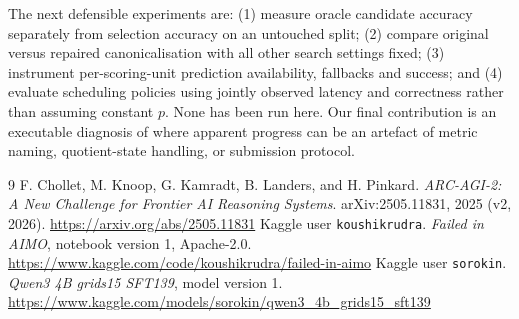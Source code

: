 \documentclass[10pt,a4paper]{article}
\begin{document}
The next defensible experiments are: (1) measure oracle candidate accuracy separately from selection accuracy on an untouched split; (2) compare original versus repaired canonicalisation with all other search settings fixed; (3) instrument per-scoring-unit prediction availability, fallbacks and success; and (4) evaluate scheduling policies using jointly observed latency and correctness rather than assuming constant $p$. None has been run here. Our final contribution is an executable diagnosis of where apparent progress can be an artefact of metric naming, quotient-state handling, or submission protocol.

\begin{thebibliography}{9}
 F. Chollet, M. Knoop, G. Kamradt, B. Landers, and H. Pinkard. \emph{ARC-AGI-2: A New Challenge for Frontier AI Reasoning Systems}. arXiv:2505.11831, 2025 (v2, 2026). \url{https://arxiv.org/abs/2505.11831}
 Kaggle user \texttt{koushikrudra}. \emph{Failed in AIMO}, notebook version 1, Apache-2.0. \url{https://www.kaggle.com/code/koushikrudra/failed-in-aimo}
 Kaggle user \texttt{sorokin}. \emph{Qwen3 4B grids15 SFT139}, model version 1. \url{https://www.kaggle.com/models/sorokin/qwen3_4b_grids15_sft139}
\end{thebibliography}
\end{document}
